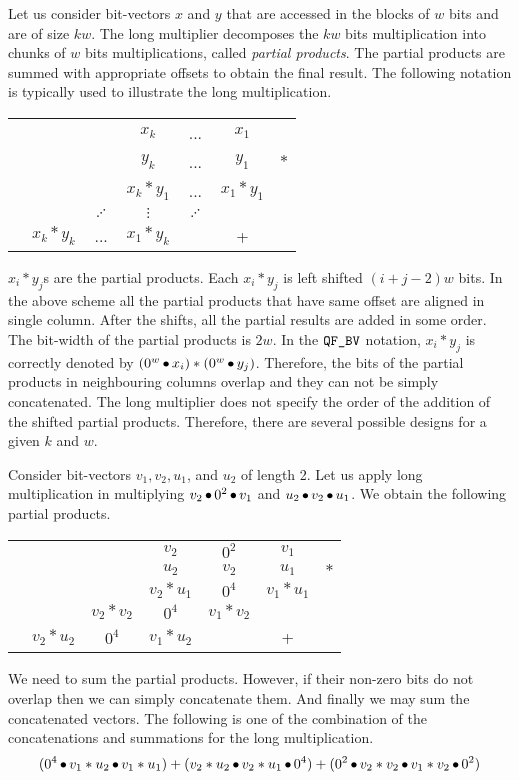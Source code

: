 Let us consider bit-vectors $x$ and $y$ that are accessed in the blocks of $w$
bits and are of size $kw$.
%
The long multiplier decomposes the $kw$ bits multiplication 
into chunks of $w$ bits multiplications, called {\em partial products}.
%
The partial products are summed with appropriate offsets to obtain
the final result.
%
The following notation is typically used to illustrate
the long multiplication.
%
\begin{center}
\begin{tabular}{c@{\quad}c@{\quad}c@{\quad}c@{\quad}c@{\quad}c@{\quad}c}
  &&& $x_{k}$ & ... & $x_1$&\\ 
  &&& $y_{k}$ & ... & $y_1$&$*$\\ \hline
  &&&$x_k*y_1$& ... & $x_1*y_1$&\\
  &&$\iddots$&$\vdots$& $\iddots$ && \\
  &$x_k*y_k$& ... &$x_1*y_k$&  & +&\\\hline
\end{tabular}  
\end{center}
$x_i * y_j$s are the partial products.
%
Each $x_i*y_j$ is left shifted $(i+j-2)w$ bits. 
%
In the above scheme all the partial products that have same offset are 
aligned in single column.
%
After the shifts, all the partial results are added in some order.
%
The bit-width of the partial products is $2w$.
%
In the $\texttt{QF\_BV}$ notation, $x_i * y_j$ is correctly denoted by
$(0^w \mathop{\bullet} x_i)*(0^w \mathop{\bullet} y_j)$.
%
Therefore, the bits of the partial products in neighbouring columns overlap
and they can not be simply concatenated.
%
The long multiplier does not specify the order of the addition
of the shifted partial products.
%
Therefore, there are several possible designs for a given $k$ and $w$.

\begin{example}
  Consider bit-vectors $v_1,v_2,u_1$, and $u_2$ of length 2.
  Let us apply long multiplication in multiplying
  $v_2 \mathop{\bullet} 0^2 \mathop{\bullet} v_1$ and $u_2 \mathop{\bullet} v_2 \mathop{\bullet} u_1$.
  We obtain the following partial products.
\begin{center}
\begin{tabular}{c@{\quad}c@{\quad}c@{\quad}c@{\quad}c@{\quad}c@{\quad}c}
  &&& $v_2$ & $0^2$ & $v_1$&\\ 
  &&& $u_2$ & $v_2$ & $u_1$&$*$\\ \hline
  &&&$v_2*u_1$& $0^4$ & $v_1*u_1$&\\
  &&$v_2*v_2$&$0^4$& $v_1*v_2$ && \\
  &$v_2*u_2$& $0^4$ &$v_1*u_2$&  & +&\\\hline
\end{tabular}
\end{center}
We need to sum the partial products. However, if their non-zero bits 
do not overlap then we can simply concatenate them.
%
And finally we may sum the concatenated vectors.
%
The following is one of the combination of the concatenations and 
summations for the long multiplication.
$$
( 0^4 \mathop{\bullet} v_1*u_2 \mathop{\bullet} v_1*u_1) +
(v_2*u_2 \mathop{\bullet} v_2*u_1 \mathop{\bullet} 0^4) +
(0^2 \mathop{\bullet} v_2*v_2 \mathop{\bullet} v_1*v_2 \mathop{\bullet} 0^2)
$$
\end{example}



